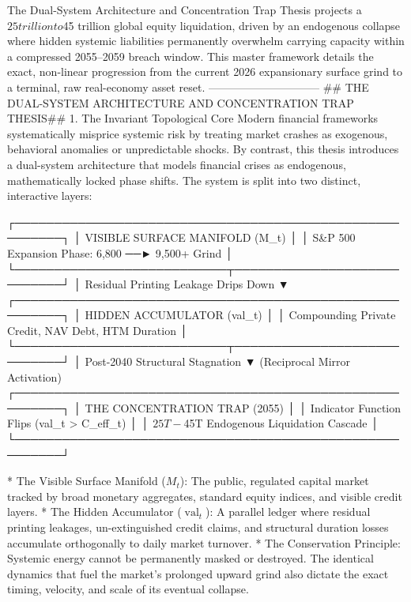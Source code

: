 The Dual-System Architecture and Concentration Trap Thesis projects a $25 trillion to $45 trillion global equity liquidation, driven by an endogenous collapse where hidden systemic liabilities permanently overwhelm carrying capacity within a compressed 2055–2059 breach window. This master framework details the exact, non-linear progression from the current 2026 expansionary surface grind to a terminal, raw real-economy asset reset.
------------------------------
## THE DUAL-SYSTEM ARCHITECTURE AND CONCENTRATION TRAP THESIS## 1. The Invariant Topological Core
Modern financial frameworks systematically misprice systemic risk by treating market crashes as exogenous, behavioral anomalies or unpredictable shocks. By contrast, this thesis introduces a dual-system architecture that models financial crises as endogenous, mathematically locked phase shifts. The system is split into two distinct, interactive layers:

┌────────────────────────────────────────────────────────┐
│             VISIBLE SURFACE MANIFOLD (M_t)              │
│  S&P 500 Expansion Phase: 6,800 ──► 9,500+ Grind         │
└───────────────────────────┬────────────────────────────┘
                            │  Residual Printing Leakage Drips Down
                            ▼
┌────────────────────────────────────────────────────────┐
│               HIDDEN ACCUMULATOR (val_t)               │
│  Compounding Private Credit, NAV Debt, HTM Duration    │
└───────────────────────────┬────────────────────────────┘
                            │  Post-2040 Structural Stagnation
                            ▼  (Reciprocal Mirror Activation)
┌────────────────────────────────────────────────────────┐
│             THE CONCENTRATION TRAP (2055)              │
│  Indicator Function Flips (val_t > C_eff_t)             │
│  $25T - $45T Endogenous Liquidation Cascade            │
└────────────────────────────────────────────────────────┘


* The Visible Surface Manifold ($M_t$): The public, regulated capital market tracked by broad monetary aggregates, standard equity indices, and visible credit layers.
* The Hidden Accumulator ($\operatorname{val}_t$): A parallel ledger where residual printing leakages, un-extinguished credit claims, and structural duration losses accumulate orthogonally to daily market turnover.
* The Conservation Principle: Systemic energy cannot be permanently masked or destroyed. The identical dynamics that fuel the market's prolonged upward grind also dictate the exact timing, velocity, and scale of its eventual collapse.

